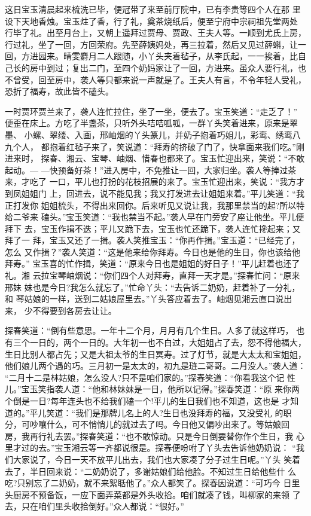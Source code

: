 这日宝玉清晨起来梳洗已毕，便冠带了来至前厅院中，已有李贵等四个人在那
里设下天地香烛。宝玉炷了香，行了礼，奠茶烧纸后，便至宁府中宗祠祖先堂两处
行毕了礼。出至月台上，又朝上遥拜过贾母、贾政、王夫人等。一顺到尤氏上房，
行过礼，坐了一回，方回荣府。先至薛姨妈处，再三拉着，然后又见过薛蝌，让一
回，方进园来。晴雯麝月二人跟随，小丫头夹着毡子，从李氏起，一一挨着，比自
己长的房中到过；复出二门，至四个奶妈家让了一回，方进来。虽众人要行礼，也
不曾受，回至房中，袭人等只都来说一声就是了。王夫人有言，不令年轻人受礼，
恐折了福寿，故此皆不磕头。

一时贾环贾兰来了，袭人连忙拉住，坐了一坐，便去了。宝玉笑道：“走乏了！”
便歪在床上。方吃了半盏茶，只听外头咭咭呱呱，一群丫头笑着进来，原来是翠墨、
小螺、翠缕、入画，邢岫烟的丫头篆儿，并奶子抱着巧姐儿，彩鸾、绣鸾八九个人，
都抱着红毡子来了，笑说道：“拜寿的挤破了门了，快拿面来我们吃。”刚进来时，
探春、湘云、宝琴、岫烟、惜春也都来了。宝玉忙迎出来，笑说：“不敢起动。—
—快预备好茶！”进入房中，不免推让一回，大家归坐。袭人等捧过茶来，才吃了
一口，平儿也打扮的花枝招展的来了。宝玉忙迎出来，笑说：“我方才到凤姐姐门
上，回进去，说不能见我；我又打发进去让姐姐来着。”平儿笑道：“我正打发你
姐姐梳头，不得出来回你。后来听见又说让我，我那里禁当的起?所以特给二爷来
磕头。”宝玉笑道：“我也禁当不起。”袭人早在门旁安了座让他坐。平儿便拜下
去，宝玉作揖不迭；平儿又跪下去，宝玉也忙还跪下，袭人连忙搀起来；又拜了一
拜，宝玉又还了一揖。袭人笑推宝玉：“你再作揖。”宝玉道：“已经完了，怎么
又作揖？”袭人笑道：“这是他来给你拜寿。今日也是他的生日，你也该给他拜寿。”
宝玉喜的忙作揖，笑道：“原来今日也是姐姐的好日子！”平儿赶着也还了礼。湘
云拉宝琴岫烟说：“你们四个人对拜寿，直拜一天才是。”探春忙问：“原来邢妹
妹也是今日?我怎么就忘了。”忙命丫头：“去告诉二奶奶，赶着补了一分礼，和
琴姑娘的一样，送到二姑娘屋里去。”丫头答应着去了。岫烟见湘云直口说出来，
少不得要到各房去让让。

探春笑道：“倒有些意思。一年十二个月，月月有几个生日。人多了就这样巧，
也有三个一日的，两个一日的。大年初一也不白过，大姐姐占了去，怨不得他福大，
生日比别人都占先；又是大祖太爷的生日冥寿。过了灯节，就是大太太和宝姐姐，
他们娘儿两个遇的巧。三月初一是太太的，初九是琏二哥哥。二月没人。”袭人道：
“二月十二是林姑娘，怎么没人?只不是咱们家的。”探春笑道：“你看我这个记
性儿。”宝玉笑指袭人道：“他和林妹妹是一日，他所以记得。”探春笑道：“原
来你两个倒是一日?每年连头也不给我们磕一个!平儿的生日我们也不知道，这也是
才知道的。”平儿笑道：“我们是那牌儿名上的人?生日也没拜寿的福，又没受礼
的职分，可吵嚷什么，可不悄悄儿的就过去了吗。今日他又偏吵出来了。等姑娘回
房，我再行礼去罢。”探春笑道：“也不敢惊动。只是今日倒要替你作个生日，我
心里才过的去。”宝玉湘云等一齐都说很是。探春便吩咐了丫头去告诉他奶奶说：
“我们大家说了，今日一天不放平儿出去，我们也大家凑了分子过生日呢。”丫头
笑着去了，半日回来说：“二奶奶说了，多谢姑娘们给他脸。不知过生日给他些什
么吃?只别忘了二奶奶，就不来絮聒他了。”众人都笑了。探春因说道：“可巧今
日里头厨房不预备饭，一应下面弄菜都是外头收拾。咱们就凑了钱，叫柳家的来领
了去，只在咱们里头收拾倒好。”众人都说：“很好。”

